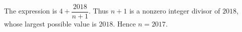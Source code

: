 The expression is $4+\dfrac{2018}{n+1}$. Thus $n+1$ is a nonzero integer divisor of $2018$, whose largest possible value is $2018$. Hence $\boxed{n=2017}$.
